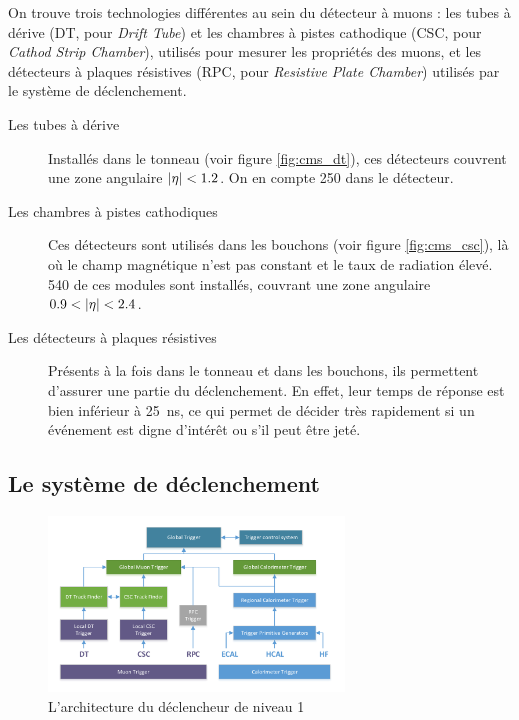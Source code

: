 On trouve trois technologies différentes au sein du détecteur à muons : les tubes à dérive (DT, pour \emph{Drift Tube}) et les chambres à pistes cathodique (CSC, pour \emph{Cathod Strip Chamber}), utilisés pour mesurer les propriétés des muons, et les détecteurs à plaques résistives (RPC, pour \emph{Resistive Plate Chamber}) utilisés par le système de déclenchement.

\begin{description}
  \item[Les tubes à dérive] Installés dans le tonneau (voir figure \ref{fig:cms_dt}), ces détecteurs couvrent une zone angulaire $\lvert \eta \rvert < 1.2$. On en compte 250 dans le détecteur.
  \item[Les chambres à pistes cathodiques] Ces détecteurs sont utilisés dans les bouchons (voir figure \ref{fig:cms_csc}), là où le champ magnétique n'est pas constant et le taux de radiation élevé. 540 de ces modules sont installés, couvrant une zone angulaire $\num{0.9} < \lvert \eta \rvert < \num{2.4}$.
  \item[Les détecteurs à plaques résistives] Présents à la fois dans le tonneau et dans les bouchons, ils permettent d'assurer une partie du déclenchement. En effet, leur temps de réponse est bien inférieur à \SI{25}{\ns}, ce qui permet de décider très rapidement si un événement est digne d’intérêt ou s'il peut être jeté.
\end{description}


\subsection{Le système de déclenchement}

\begin{figure} \centering
  \includegraphics[width=0.7\textwidth]{chapitre2/figs/L1.pdf}
  \caption{L'architecture du déclencheur de niveau 1}
  \label{fig:l1}
\end{figure}

